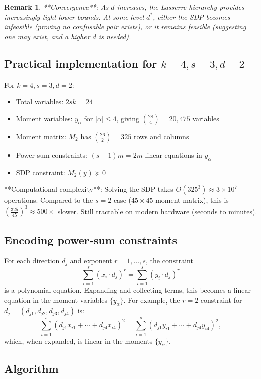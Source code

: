\documentclass[12pt,a4paper]{article}
\newtheorem{remark}{Remark}
\begin{document}
\begin{remark}
  **Convergence**: As $d$ increases, the Lasserre hierarchy provides increasingly tight
  lower bounds.  At some level $d^*$, either the SDP becomes infeasible (proving no confusable
  pair exists), or it remains feasible (suggesting one may exist, and a higher $d$ is needed).
\end{remark}

\subsection*{Practical implementation for $k=4, s=3, d=2$}

For $k=4, s=3, d=2$:
\begin{itemize}
  \item Total variables: $2sk = 24$
  \item Moment variables: $y_\alpha$ for $|\alpha| \leq 4$, giving $\binom{28}{4} = 20,475$ variables
  \item Moment matrix: $M_2$ has $\binom{26}{2} = 325$ rows and columns
  \item Power-sum constraints: $(s-1)m = 2m$ linear equations in $y_\alpha$
  \item SDP constraint: $M_2(y) \succeq 0$
\end{itemize}

**Computational complexity**: Solving the SDP takes $O(325^3) \approx 3 \times 10^7$ operations.
Compared to the $s=2$ case ($45 \times 45$ moment matrix), this is $(\frac{325}{45})^3 \approx 500\times$
slower.  Still tractable on modern hardware (seconds to minutes).

\subsection*{Encoding power-sum constraints}

For each direction $d_j$ and exponent $r=1,\ldots,s$, the constraint
\[
  \sum_{i=1}^s (x_i \cdot d_j)^r = \sum_{i=1}^s (y_i \cdot d_j)^r
\]
is a polynomial equation.  Expanding and collecting terms, this becomes a linear equation
in the moment variables $\{y_\alpha\}$.  For example, the $r=2$ constraint for $d_j = (d_{j1}, d_{j2}, d_{j3}, d_{j4})$ is:
\[
  \sum_{i=1}^s (d_{j1} x_{i1} + \cdots + d_{j4} x_{i4})^2
  = \sum_{i=1}^s (d_{j1} y_{i1} + \cdots + d_{j4} y_{i4})^2,
\]
which, when expanded, is linear in the moments $\{y_\alpha\}$.

\subsection*{Algorithm}
\end{document}
